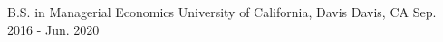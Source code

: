 

\begin{cventries}

  \cventry
    {B.S. in Managerial Economics} %
    {University of California, Davis} %
    {Davis, CA} %
    {Sep. 2016 - Jun. 2020} %
    {}

\end{cventries}

